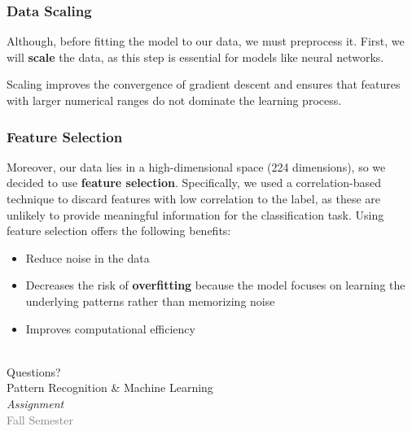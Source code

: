 \documentclass{beamer}
\begin{document}
\begin{frame}
\frametitle{Data Scaling}
Although, before fitting the model to our data, we must preprocess it. First, we will \textbf{scale} the data, as this step is essential for models like neural networks.
\vspace{0.5cm}

Scaling improves the convergence of gradient descent and ensures that features with larger numerical ranges do not dominate the learning process.

\end{frame}

\begin{frame}
\frametitle{Feature Selection}
Moreover, our data lies in a high-dimensional space (224 dimensions), so we decided to use \textbf{feature selection}. Specifically, we used a correlation-based technique to discard features with low correlation to the label, as these are unlikely to provide meaningful information for the classification task. Using feature selection offers the following benefits:
\vspace{0.5cm}
\begin{itemize}
    \item Reduce noise in the data
    \item Decreases the risk of \textbf{overfitting} because the model focuses on learning the underlying patterns rather than memorizing noise
    \item Improves computational efficiency
\end{itemize}
\end{frame}

\begin{frame}[plain]
    \begin{center}
        
         \hfill
         \\[1cm]

        {\Huge Questions?} \\[0.5cm]
        {\large Pattern Recognition \& Machine Learning \\ \emph{\textcolor[RGB]{139,0,0}{Assignment}}} \\[1cm]

        {\tiny \textcolor{gray}{Fall Semester}}
    \end{center}
\end{frame}
\end{document}
